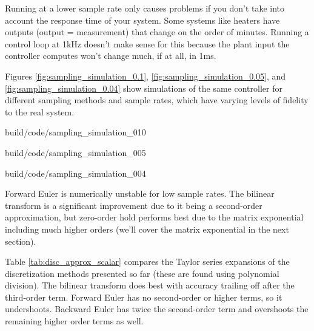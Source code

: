 Running at a lower sample rate only causes problems if you don't take into
account the response time of your system. Some systems like heaters have outputs
(output = measurement) that change on the order of minutes. Running a control
loop at 1kHz doesn't make sense for this because the plant input the controller
computes won't change much, if at all, in 1ms.

Figures \ref{fig:sampling_simulation_0.1}, \ref{fig:sampling_simulation_0.05},
and \ref{fig:sampling_simulation_0.04} show simulations of the same controller
for different sampling methods and sample rates, which have varying levels of
fidelity to the real system.

\begin{svg}{build/code/sampling_simulation_010}
  \caption{Sampling methods for system simulation with $T = 0.1s$}
  \label{fig:sampling_simulation_0.1}
\end{svg}

\begin{svg}{build/code/sampling_simulation_005}
  \caption{Sampling methods for system simulation with $T = 0.05s$}
  \label{fig:sampling_simulation_0.05}
\end{svg}

\begin{svg}{build/code/sampling_simulation_004}
  \caption{Sampling methods for system simulation with $T = 0.04s$}
  \label{fig:sampling_simulation_0.04}
\end{svg}

Forward Euler is numerically unstable for low sample rates. The bilinear
transform is a significant improvement due to it being a second-order
approximation, but zero-order hold performs best due to the matrix exponential
including much higher orders (we'll cover the matrix exponential in the next
section).

Table \ref{tab:disc_approx_scalar} compares the Taylor series expansions of the
discretization methods presented so far (these are found using polynomial
division). The bilinear transform does best with accuracy trailing off after the
third-order term. Forward Euler has no second-order or higher terms, so it
undershoots. Backward Euler has twice the second-order term and overshoots the
remaining higher order terms as well.

